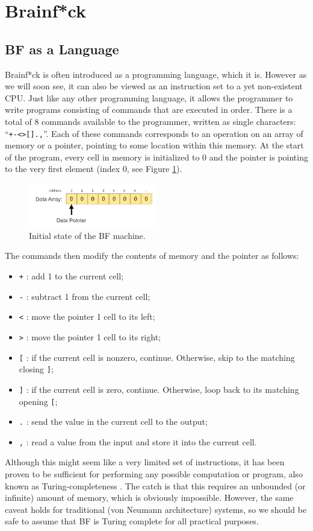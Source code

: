 \section{Brainf*ck}\label{section:brainfck}                                                       
\subsection{BF as a Language}
Brainf*ck is often introduced as a programming language, which it is. However as we will soon see, it can also be viewed as an instruction set to a yet non-existent CPU. Just like any other programming language, it allows the programmer to write programs consisting of commands that are executed in order. There is a total of 8 commands available to the programmer, written as single characters: ``\texttt{+-<>[].,}''. Each of these commands corresponds to an operation on an array of memory or a pointer, pointing to some location within this memory. At the start of the program, every cell in memory is initialized to 0 and the pointer is pointing to the very first element (index 0, see Figure \ref{fig:bfmachine_initial}).
%
\begin{figure}[H]
  \centering
  \includegraphics[width=0.5\textwidth]{img/bfmachine_initial}
  \caption{Initial state of the BF machine.}
  \label{fig:bfmachine_initial}
\end{figure}
%
The commands then modify the contents of memory and the pointer as follows:
\begin{itemize}
\item \texttt{+} : add 1 to the current cell;
\item \texttt{-} : subtract 1 from the current cell;
\item \texttt{<} : move the pointer 1 cell to its left;
\item \texttt{>} : move the pointer 1 cell to its right;
\item \texttt{[} : if the current cell is nonzero, continue. Otherwise, skip to the matching closing \texttt{]};
\item \texttt{]} : if the current cell is zero, continue. Otherwise, loop back to its matching opening \texttt{[};
\item \texttt{.} : send the value in the current cell to the output;
\item \texttt{,} : read a value from the input and store it into the current cell.
\end{itemize}
Although this might seem like a very limited set of instructions, it has been proven to be sufficient for performing any possible computation or program, also known as Turing-completeness \cite{esolang}. The catch is that this requires an unbounded (or infinite) amount of memory, which is obviously impossible. However, the same caveat holds for traditional (von Neumann architecture) systems, so we should be safe to assume that BF is Turing complete for all practical purposes.

